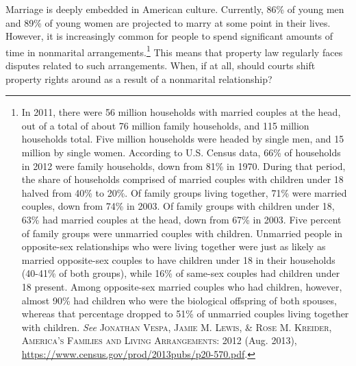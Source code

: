 Marriage is deeply embedded in American culture. Currently, 86\% of young men
and 89\% of young women are projected to marry at some point in their lives.
However, it is increasingly common for people to spend significant amounts of
time in nonmarital arrangements.\footnote{In 2011, there were 56 million
households with married couples at the head, out of a total of about 76 million
family households, and 115 million households total. Five million households
were headed by single men, and 15 million by single women. According to U.S.
Census data, 66\% of households in 2012 were family households, down from 81\%
in 1970. During that period, the share of households comprised of married
couples with children under 18 halved from 40\% to 20\%. Of family groups
living together, 71\% were married couples, down from 74\% in 2003. Of family
groups with children under 18, 63\% had married couples at the head, down from
67\% in 2003. Five percent of family groups were unmarried couples with
children. Unmarried people in opposite-sex relationships who were living
together were just as likely as married opposite-sex couples to have children
under 18 in their households (40-41\% of both groups), while 16\% of same-sex
couples had children under 18 present. Among opposite-sex married couples who
had children, however, almost 90\% had children who were the biological
offspring of both spouses, whereas that percentage dropped to 51\% of unmarried
couples living together with children. \emph{See} \textsc{Jonathan Vespa, Jamie
M. Lewis, \& Rose M. Kreider, America's Families and Living Arrangements: 2012}
(Aug. 2013), \url{https://www.census.gov/prod/2013pubs/p20-570.pdf}.} This means
that property law regularly faces disputes related to such arrangements. When,
if at all, should courts shift property rights around as a result of a
nonmarital relationship?

